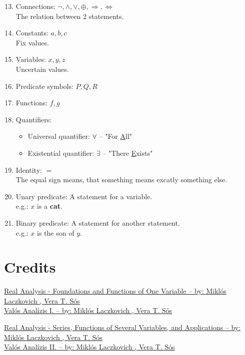 \documentclass{article}
\let\stdsection\section
\renewcommand\section{\newpage\stdsection}
\begin{document}
\begin{enumerate}[label=Def. \arabic*:, leftmargin=3.5em, align=left]
  \setcounter{enumi}{12}
  \item Connections: $\neg, \wedge, \vee, \oplus, \Rightarrow, \Leftrightarrow$\\
  The relation between 2 statements.

  \item Constants: $a,b,c$\\
  Fix values.

  \item Variables: $x,y,z$\\
  Uncertain values.

  \item Predicate symbols: $P, Q, R$
  
  \item Functions: $f, g$
  
  \item Quantifiers:
  \begin{itemize}[label=-,leftmargin=2.5em]
    \item Universal quantifier: $\forall$ -- "For \underline{A}ll"
    \item Existential quantifier: $\exists$ -- "There \underline{E}xists"
  \end{itemize}

  \item Identity: $=$\\
  The equal sign means, that something means excatly something else.

  \item Unary predicate: A statement for a variable.\\
  e.g.: $x$ is a \textbf{cat}. 
  
  \item Binary predicate: A statement for another statement.\\
  e.g.: $x$ is the son of $y$. 
\end{enumerate}

\section{Credits}

\href{https://link.springer.com/book/10.1007/978-1-4939-2766-1}{Real Analysis - Foundations and Functions of One Variable -- by: Miklós Laczkovich , Vera T. Sós}\\
\href{https://www.typotex.hu/book/5080/laczkovich_miklos_t_sos_vera_valos_analizis_1}{Valós Analízis I. -- by: Miklós Laczkovich , Vera T. Sós}

\href{https://link.springer.com/book/10.1007/978-1-4939-7369-9}{Real Analysis - Series, Functions of Several Variables, and Applications -- by: Miklós Laczkovich , Vera T. Sós}\\
\href{https://www.typotex.hu/book/5755/laczkovich_miklos_t_sos_vera_valos_analizis_2}{Valós Analízis II. -- by: Miklós Laczkovich , Vera T. Sós}
\end{document}
